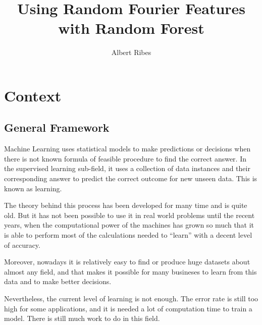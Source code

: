 \documentclass{article}
\title{Using Random Fourier Features with Random Forest}
\author{Albert Ribes}
\begin{document}
\maketitle
\tableofcontents
\newpage

\section{Context}
    \subsection{General Framework}

    Machine Learning uses statistical models to make predictions or decisions
    when there is not known formula of feasible procedure to find the correct
    answer. In the supervised learning sub-field, it uses a collection of
    data instances and their corresponding answer to predict
    the correct outcome for new unseen data. This is known as learning.

    The theory behind this process has been developed for many time and is quite
    old. But it has not been possible to use it in real world problems until the
    recent years, when the computational power of the machines has grown so much
    that it is able to perform most of the calculations needed to ``learn'' with
    a decent level of accuracy.

    Moreover, nowadays it is relatively easy to find or produce huge datasets
    about almost any field, and that makes it possible for many busineses to learn
    from this data and to make better decisions.

    Nevertheless, the current level of learning is not enough. The error rate is still too high for some applications, and it is needed a lot of
    computation time to train a model. There is still much work to do in
    this field.
\end{document}
